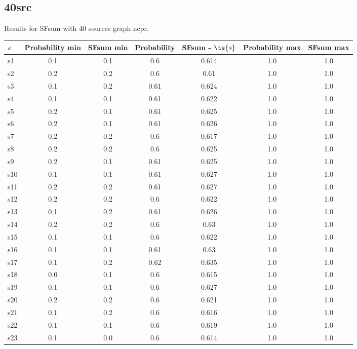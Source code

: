 \documentclass{article}
\begin{document}
\newpage

\subsection{40src}

\noindent Results for SFsum with 40 sources graph ncpr.

\noindent\begin{tabular}{|l|c|c|c|c|c|c|}
\hline
$s$& Probability min & SFsum min & Probability & SFsum - $\ts{s}$ & Probability max & SFsum max\\
\hline
s1 &0.1 & 0.1 & 0.6 & 0.614 & 1.0 & 1.0\\
\hline
s2 &0.2 & 0.2 & 0.6 & 0.61 & 1.0 & 1.0\\
\hline
s3 &0.1 & 0.2 & 0.61 & 0.624 & 1.0 & 1.0\\
\hline
s4 &0.1 & 0.1 & 0.61 & 0.622 & 1.0 & 1.0\\
\hline
s5 &0.2 & 0.1 & 0.61 & 0.625 & 1.0 & 1.0\\
\hline
s6 &0.2 & 0.1 & 0.61 & 0.626 & 1.0 & 1.0\\
\hline
s7 &0.2 & 0.2 & 0.6 & 0.617 & 1.0 & 1.0\\
\hline
s8 &0.2 & 0.2 & 0.6 & 0.625 & 1.0 & 1.0\\
\hline
s9 &0.2 & 0.1 & 0.61 & 0.625 & 1.0 & 1.0\\
\hline
s10 &0.1 & 0.1 & 0.61 & 0.627 & 1.0 & 1.0\\
\hline
s11 &0.2 & 0.2 & 0.61 & 0.627 & 1.0 & 1.0\\
\hline
s12 &0.2 & 0.2 & 0.6 & 0.622 & 1.0 & 1.0\\
\hline
s13 &0.1 & 0.2 & 0.61 & 0.626 & 1.0 & 1.0\\
\hline
s14 &0.2 & 0.2 & 0.6 & 0.63 & 1.0 & 1.0\\
\hline
s15 &0.1 & 0.1 & 0.6 & 0.622 & 1.0 & 1.0\\
\hline
s16 &0.1 & 0.1 & 0.61 & 0.63 & 1.0 & 1.0\\
\hline
s17 &0.1 & 0.2 & 0.62 & 0.635 & 1.0 & 1.0\\
\hline
s18 &0.0 & 0.1 & 0.6 & 0.615 & 1.0 & 1.0\\
\hline
s19 &0.1 & 0.1 & 0.6 & 0.627 & 1.0 & 1.0\\
\hline
s20 &0.2 & 0.2 & 0.6 & 0.621 & 1.0 & 1.0\\
\hline
s21 &0.1 & 0.2 & 0.6 & 0.616 & 1.0 & 1.0\\
\hline
s22 &0.1 & 0.1 & 0.6 & 0.619 & 1.0 & 1.0\\
\hline
s23 &0.1 & 0.0 & 0.6 & 0.614 & 1.0 & 1.0\\

\end{tabular}
\end{document}
